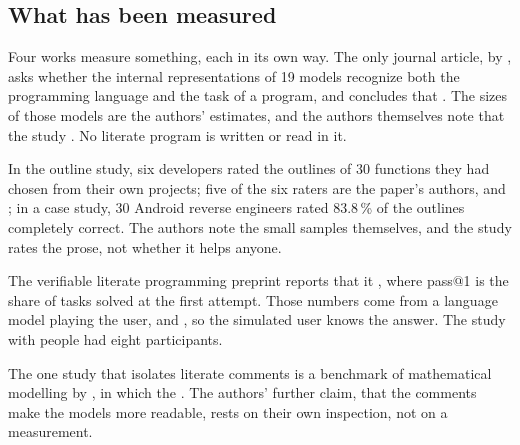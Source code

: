 \subsection{What has been measured}

Four works measure something, each in its own way.
The only journal article, by \textcite{SunStaron2026}, asks whether the
internal representations of 19 models recognize both the programming language
and the task of a program, and concludes that
.
The sizes of those models are the authors' estimates, and the authors
themselves note that the study .
No literate program is written or read in it.

In the outline study, six developers rated the outlines of 30 functions they
had chosen from their own projects; five of the six raters are the paper's
authors, and ; in a case
study, 30 Android reverse engineers rated 83.8\,\% of the outlines completely
correct.
The authors note the small samples themselves, and the study rates the prose,
not whether it helps anyone.

The verifiable literate programming preprint reports that it
, where pass@1 is the share of tasks solved at the first
attempt.
Those numbers come from a language model playing the user, and
, so the simulated user knows the
answer.
The study with people had eight participants.

The one study that isolates literate comments is a benchmark of mathematical
modelling by \textcite{RossiPrestwich2026}, in which the
.
The authors' further claim, that the comments make the models more readable,
rests on their own inspection, not on a measurement.

